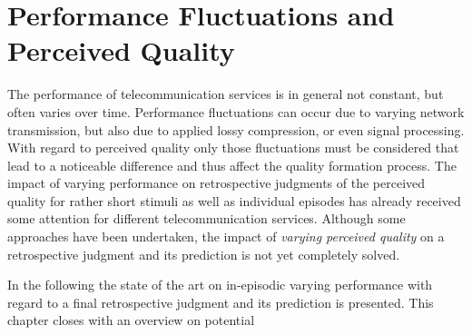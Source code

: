\newpage
\section{Performance Fluctuations and Perceived Quality}\label{chap:04}



The performance of telecommunication services is in general not constant, but often varies over time.
Performance fluctuations can occur due to varying network transmission, but also due to applied lossy compression, or even signal processing.
With regard to perceived quality only those fluctuations must be considered that lead to a noticeable difference and thus affect the quality formation process.
The impact of varying performance on retrospective judgments of the perceived quality for rather short stimuli as well as individual episodes has already received some attention for different telecommunication services.
Although some approaches have been undertaken, the impact of \emph{varying perceived quality} on a retrospective judgment and its prediction is not yet completely solved.

In the following the state of the art on in-episodic varying performance with regard to a final retrospective judgment and its prediction is presented.
This chapter closes with an overview on potential 

